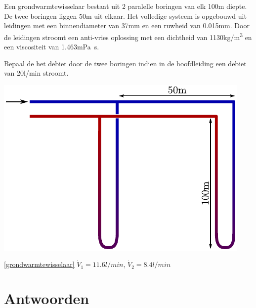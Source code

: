 \begin{toepassing}[*]
	\label{grondwarmtewisselaar}
Een grondwarmtewisselaar bestaat uit 2 paralelle boringen van elk 100m diepte. De twee boringen liggen 50m uit elkaar. Het volledige systeem is opgebouwd uit leidingen met een binnendiameter van 37mm en een ruwheid van 0.015mm. Door de leidingen stroomt een anti-vries oplossing met een dichtheid van 1130\unit{kg/m^3} en een viscositeit van 1.463\unit{mPa s}.
	
Bepaal de het debiet door de twee boringen indien in de hoofdleiding een debiet van \unit{20}{l/min} stroomt.

	\centering	
	\includegraphics{fig/leidingnetwerken/grondwarmtewisselaar}
\end{toepassing}
\begin{antwoord}{\ref{grondwarmtewisselaar}}
	$\dot{V}_{1} = 11.6\unit{l/min}$, $\dot{V}_{2} = 8.4\unit{l/min}$
\end{antwoord}
\section*{Antwoorden}
	\begin{multicols}{2}
	\end{multicols}